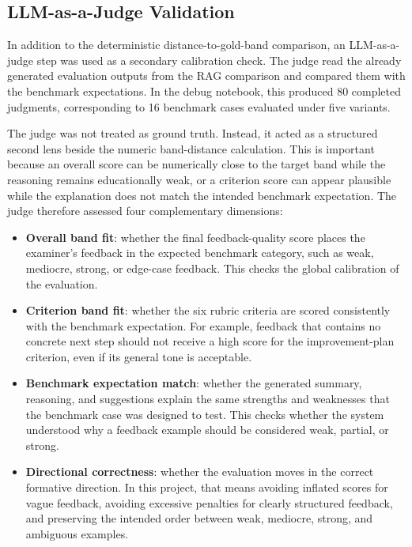 \subsection{LLM-as-a-Judge Validation}
In addition to the deterministic distance-to-gold-band comparison, an
LLM-as-a-judge step was used as a secondary calibration check. The judge read
the already generated evaluation outputs from the RAG comparison and compared
them with the benchmark expectations. In the debug notebook, this produced 80
completed judgments, corresponding to 16 benchmark cases evaluated under five
variants.

The judge was not treated as ground truth. Instead, it acted as a structured
second lens beside the numeric band-distance calculation. This is important
because an overall score can be numerically close to the target band while the
reasoning remains educationally weak, or a criterion score can appear plausible
while the explanation does not match the intended benchmark expectation. The
judge therefore assessed four complementary dimensions:
\begin{itemize}
    \item \textbf{Overall band fit}: whether the final feedback-quality score
    places the examiner's feedback in the expected benchmark category, such as
    weak, mediocre, strong, or edge-case feedback. This checks the global
    calibration of the evaluation.
    \item \textbf{Criterion band fit}: whether the six rubric criteria are
    scored consistently with the benchmark expectation. For example, feedback
    that contains no concrete next step should not receive a high score for the
    improvement-plan criterion, even if its general tone is acceptable.
    \item \textbf{Benchmark expectation match}: whether the generated summary,
    reasoning, and suggestions explain the same strengths and weaknesses that
    the benchmark case was designed to test. This checks whether the system
    understood why a feedback example should be considered weak, partial, or
    strong.
    \item \textbf{Directional correctness}: whether the evaluation moves in the
    correct formative direction. In this project, that means avoiding inflated
    scores for vague feedback, avoiding excessive penalties for clearly
    structured feedback, and preserving the intended order between weak,
    mediocre, strong, and ambiguous examples.
\end{itemize}

